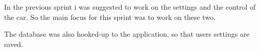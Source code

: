 In the previous sprint i was suggested to work on the settings and the control of the car.
So the main focus for this sprint was to work on these two.

The database was also hooked-up to the application, so that users settings are saved.